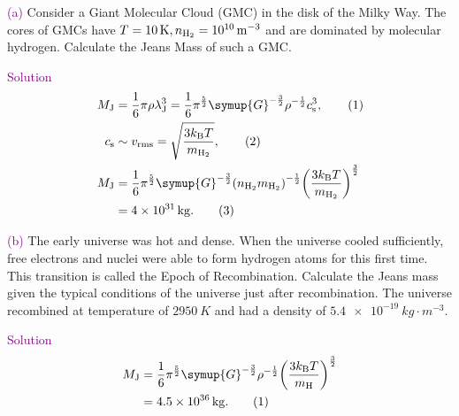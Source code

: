 \documentclass[UTF8, 12pt, a4paper, oneside, twocolumn, fontset=none]{ctexart}
\begin{document}
\hspace*{\fill}

\noindent\textcolor{purple}{(a)} Consider a Giant Molecular Cloud (GMC) in the disk of the Milky Way. The cores of GMCs have $T=\qty{10}{K}, n_{\ce{H2}}=\qty{e10}{m^{-3}}$ and are dominated by molecular hydrogen. Calculate the Jeans Mass of such a GMC.

\hspace*{\fill}

\noindent\textcolor{purple}{Solution}
\begin{align}
M_{\mathrm{J}}&=\frac{1}{6}\pi\rho\lambda_{\mathrm{J}}^{3}=\frac{1}{6}\pi^{\frac{5}{2}}\symup{G}^{-\frac{3}{2}}\rho^{-\frac{1}{2}}c_{\mathrm{s}}^{3},\tag{1}\\
c_{\mathrm{s}}&\sim{}v_{\mathrm{rms}}=\sqrt{\dfrac{3k_{\mathrm{B}}T}{m_{\ce{H2}}}},\tag{2}\\
M_{\mathrm{J}}&=\frac{1}{6}\pi^{\frac{5}{2}}\symup{G}^{-\frac{3}{2}}\mleft(n_{\ce{H2}}m_{\ce{H2}}\mright)^{-\frac{1}{2}}\mleft(\dfrac{3k_{\mathrm{B}}T}{m_{\ce{H2}}}\mright)^{\frac{3}{2}}\notag\\
&=\qty{4e31}{kg}.\tag{3}
\end{align}

\hspace*{\fill}

\noindent\textcolor{purple}{(b)} The early universe was hot and dense. When the universe cooled sufficiently, free electrons and nuclei were able to form hydrogen atoms for this first time. This transition is called the Epoch of Recombination. Calculate the Jeans mass given the typical conditions of the universe just after recombination. The universe recombined at temperature of $\qty{2950}{K}$ and had a density of $\qty{5.4e-19}{kg\cdot{}m^{-3}}$.

\hspace*{\fill}

\noindent\textcolor{purple}{Solution}
\begin{align}
M_{\mathrm{J}}&=\frac{1}{6}\pi^{\frac{5}{2}}\symup{G}^{-\frac{3}{2}}\rho^{-\frac{1}{2}}\mleft(\dfrac{3k_{\mathrm{B}}T}{m_{\ce{H}}}\mright)^{\frac{3}{2}}\notag\\
&=\qty{4.5e36}{kg}.\tag{1}
\end{align}


\end{document}
